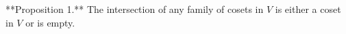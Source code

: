 **Proposition 1.** The intersection of any family of cosets in $V$ is either a coset in $V$ or is empty.
